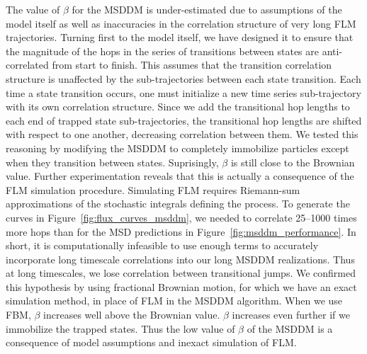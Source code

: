 \documentclass{article}
\begin{document}
  The value of $\beta$ for the MSDDM is under-estimated due to assumptions of the model
  itself as well as inaccuracies in the correlation structure of very long FLM trajectories.
  Turning first to the model itself, we have designed it to ensure that the magnitude of the
  hops in the series of transitions between states are anti-correlated from start to finish. 
  This assumes that the transition correlation structure is unaffected by the
  sub-trajectories between each state transition. Each time a state transition occurs, one
  must initialize a new time series sub-trajectory with its own correlation structure. 
  Since we add the transitional hop lengths to each end of
  trapped state sub-trajectories, the transitional hop lengths are shifted with respect 
  to one another, decreasing correlation between them. We tested this reasoning by modifying the 
  MSDDM to completely immobilize particles except when they transition between states. 
  Suprisingly, $\beta$ is still close to the Brownian value. Further experimentation 
  reveals that this is actually a consequence of the FLM simulation procedure. Simulating
  FLM requires Riemann-sum approximations of the stochastic integrals defining the process.
  To generate the curves in Figure~\ref{fig:flux_curves_msddm}, we needed to correlate 
  25--1000 times more hops than for the MSD predictions in Figure~\ref{fig:msddm_performance}. 
  In short, it is computationally infeasible to use enough terms to accurately incorporate
  long timescale correlations into our long MSDDM realizations. Thus at long timescales, 
  we lose correlation between transitional jumps. We confirmed this hypothesis by using 
  fractional Brownian motion, for which we have an exact simulation method, in place of 
  FLM in the MSDDM algorithm. When we use FBM, $\beta$ increases well above the Brownian 
  value. $\beta$ increases even further if we immobilize the trapped states. Thus the low
  value of $\beta$ of the MSDDM is a consequence of model assumptions and inexact simulation
  of FLM.  
  
\end{document}
